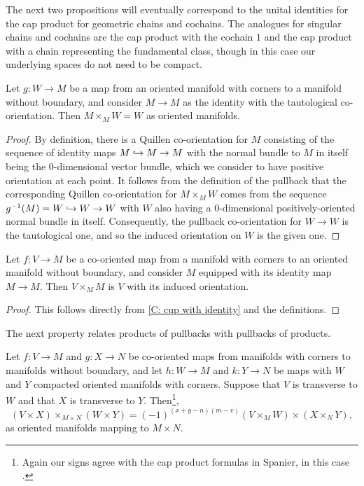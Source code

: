 The next two propositions will eventually correspond to the unital identities for the cap product for geometric chains and cochains.
The analogues for singular chains and cochains are the cap product with the cochain $1$ and the cap product with a chain representing the fundamental class, though in this case our underlying spaces do not need to be compact.

\begin{proposition}\label{P: cap with 1}
	Let $g \colon W \to M$ be a map from an oriented manifold with corners to a manifold without boundary, and consider $M \to M$ as the identity with the tautological co-orientation.
	Then $M \times_M W = W$ as oriented manifolds.
\end{proposition}

\begin{proof}
	By definition, there is a Quillen co-orientation for $M$ consisting of the sequence of identity maps $M \hookrightarrow M \to M$ with the normal bundle to $M$ in itself being the $0$-dimensional vector bundle, which we consider to have positive orientation at each point.
	It follows from the definition of the pullback that the corresponding Quillen co-orientation for $M \times_M W$ comes from the sequence $g^{-1}(M) = W \hookrightarrow W \to W$ with $W$ also having a $0$-dimensional positively-oriented normal bundle in itself.
	Consequently, the pullback co-orientation for $W \to W$ is the tautological one, and so the induced orientation on $W$ is the given one.
\end{proof}

\begin{proposition}\label{P: cap with identity M}
	Let $f \colon V \to M$ be a co-oriented map from a manifold with corners to an oriented manifold without boundary, and consider $M$ equipped with its identity map $M \to M$.
	Then $V \times_M M$ is $V$ with its induced orientation.
\end{proposition}

\begin{proof}
	This follows directly from \cref{C: cup with identity} and the definitions.
\end{proof}

The next property relates products of pullbacks with pullbacks of products.

\begin{proposition}\label{P: cap cross}
	Let $f \colon V \to M$ and $g:X \to N$ be co-oriented maps from manifolds with corners to manifolds without boundary, and let $h \colon W \to M$ and $k \colon Y \to N$ be maps with $W$ and $Y$ compacted oriented manifolds with corners.
	Suppose that $V$ is transverse to $W$ and that $X$ is transverse to $Y$.
	Then\footnote{Again our signs agree with the cap product formulas in Spanier, in this case \cite[Section 5.6.21]{Span81}.},
	$$(V \times X)\times_{M \times N} (W \times Y) = (-1)^{(x+y-n)(m-v)} (V \times_M W) \times (X \times_N Y),$$
	as oriented manifolds mapping to $M \times N$.
\end{proposition}

